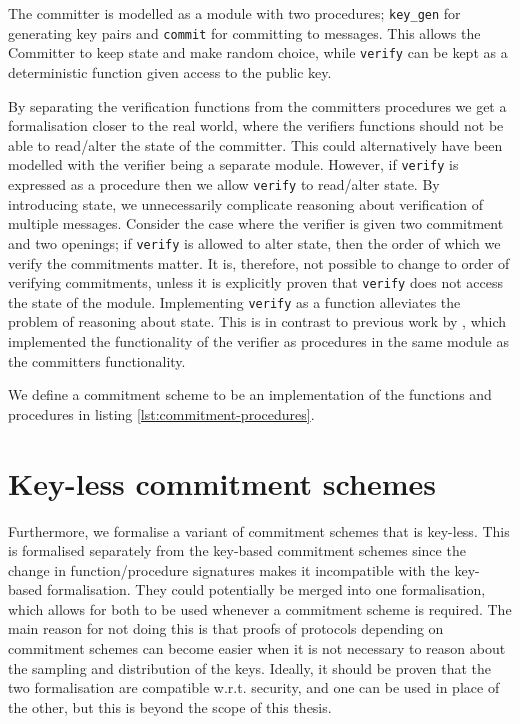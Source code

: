 The committer is modelled as a module with two procedures; \texttt{key\_gen} for generating
key pairs and \texttt{commit} for committing to messages. This allows the Committer
to keep state and make random choice, while \texttt{verify} can be kept as a
deterministic function given access to the public key.

By separating the verification functions from the committers procedures we get a
formalisation closer to the real world, where the verifiers functions should not
be able to read/alter the state of the committer. This could alternatively have
been modelled with the verifier being a separate module.
However, if \texttt{verify} is expressed as a procedure
then we allow \texttt{verify} to read/alter state. By introducing state, we
unnecessarily complicate reasoning about verification of multiple messages.
Consider the case where the verifier is given two commitment and two openings;
if \texttt{verify} is allowed to alter state, then the order of which we verify
the commitments matter. It is, therefore, not possible to change to order of
verifying commitments, unless it is explicitly proven that \texttt{verify} does
not access the state of the module.
Implementing \texttt{verify} as a function alleviates the problem of reasoning
about state.
This is in contrast to previous work by \cite{DBLP:journals/corr/MetereD17}, which
implemented the functionality of the verifier as procedures in the same
module as the committers functionality.

We define a commitment scheme to be an implementation of the functions and
procedures in listing \ref{lst:commitment-procedures}.

\section{Key-less commitment schemes}
\label{sec:commitment:key-less}
Furthermore, we formalise a variant of commitment schemes that is key-less. This
is formalised separately from the key-based commitment schemes since the
change in function/procedure signatures makes it incompatible with the key-based
formalisation. They could potentially be merged into one formalisation, which
allows for both to be used whenever a commitment scheme is required. The main
reason for not doing this is that proofs of protocols depending on commitment
schemes can become easier when it is not necessary to reason about the sampling
and distribution of the keys. Ideally, it should be
proven that the two formalisation are compatible w.r.t. security, and one can be
used in place of the other, but this is beyond the scope of this thesis.

